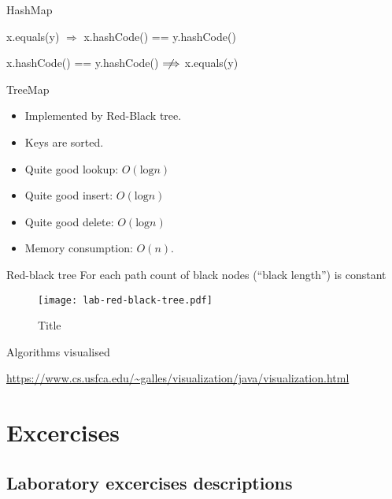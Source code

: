 \documentclass{beamer}
\begin{document}
\begin{frame}{HashMap}

\begin{center}x.equals(y) $\Longrightarrow$ x.hashCode() == y.hashCode()\end{center}
\begin{center}x.hashCode() == y.hashCode()  $\centernot\Longrightarrow$ x.equals(y)\end{center}
\end{frame}


\begin{frame}{TreeMap}

\begin{itemize}
	\item Implemented by Red-Black tree.
    \item Keys are sorted.
    \item Quite good lookup: $O(\textrm{log}n)$
    \item Quite good insert: $O(\textrm{log}n)$
    \item Quite good delete: $O(\textrm{log}n)$
    \item Memory consumption: $O(n)$.
\end{itemize}
\end{frame}


\begin{frame}{Red-black tree}
    For each path count of black nodes (``black length'') is constant
    \begin{figure}[htbp]
    \centering
        \texttt{[image: lab-red-black-tree.pdf]}
    \caption{Title}
    \label{fig:lab_red_black_tree}
    \end{figure}

\end{frame}

\begin{frame}{Algorithms visualised}
\begin{center}
    \url{https://www.cs.usfca.edu/~galles/visualization/java/visualization.html}
\end{center}
\end{frame}

\section{Excercises}
\subsection{Laboratory excercises descriptions}
\end{document}
